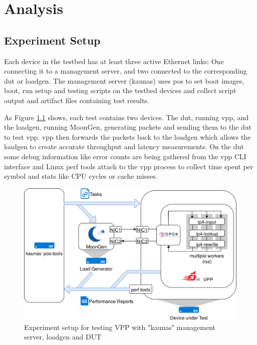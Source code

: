 
\chapter{Analysis}


\section{Experiment Setup}

Each device in the testbed has at least three active Ethernet links:
One connecting it to a management server, and two connected to the
corresponding \Ac{dut} or \Ac{loadgen}. The management server (kaunas)
uses \Ac{pos} \cite{GallScho18} to set boot images, boot, run setup
and testing scripts on the testbed devices and collect script output
and artifact files containing test results.

As Figure \ref{setup} shows, each test contains two devices. The
\Ac{dut}, running \Ac{vpp}, and the \Ac{loadgen}, running MoonGen,
generating packets and sending them to the \Ac{dut} to test \Ac{vpp}.
\Ac{vpp} then forwards the packets back to the \Ac{loadgen} which
allows the \Ac{loadgen} to create accurate throughput and latency
measurements.
On the \Ac{dut} some debug information like error counts are being
gathered from the \Ac{vpp} CLI interface and Linux perf tools
\cite{perf} attach to the \Ac{vpp} process to collect time spent per
symbol and stats like CPU cycles or cache misses.

\begin{figure}[!ht]
\noindent\hspace{0.5mm}\includegraphics[width=\linewidth]{pics/topology.png}
\caption{Experiment setup for testing VPP with "kaunas" management server, \Ac{loadgen} and DUT}
\label{setup}
\end{figure}


